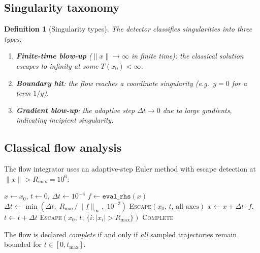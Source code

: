 \documentclass[11pt,a4paper]{article}
\newtheorem{definition}{Definition}
\begin{document}
\subsection{Singularity taxonomy}

\begin{definition}[Singularity types]
The detector classifies singularities into three types:
\begin{enumerate}
  \item \textbf{Finite-time blow-up} ($\lVert x\rVert\to\infty$ in
    finite time): the classical solution escapes to infinity at some
    $T(x_{0})<\infty$.
  \item \textbf{Boundary hit}: the flow reaches a coordinate singularity
    (e.g.\ $y=0$ for a term $1/y$).
  \item \textbf{Gradient blow-up}: the adaptive step $\Delta t\to 0$
    due to large gradients, indicating incipient singularity.
\end{enumerate}
\end{definition}

\subsection{Classical flow analysis}

The flow integrator uses an adaptive-step Euler method with escape
detection at $\lVert x\rVert>R_{\max}=10^{6}$:

\begin{algorithm}[H]
\caption{Classical flow analysis (\texttt{analyze\_classical\_flow})}
\begin{algorithmic}[1]
  \State $x\gets x_{0}$, $t\gets 0$, $\Delta t\gets 10^{-4}$
    \State $f\gets\texttt{eval\_rhs}(x)$
    \State $\Delta t\gets\min(\Delta t,\;R_{\max}/\lVert f\rVert_{\infty},\;10^{-2})$
      \State \Return \textsc{Escape}$(x_{0},\,t,\,\text{all axes})$
    \EndIf
    \State $x\gets x+\Delta t\cdot f$, \quad $t\gets t+\Delta t$
      \State \Return \textsc{Escape}$(x_{0},\,t,\,\{i:\lvert x_{i}\rvert>R_{\max}\})$
    \EndIf
  \EndWhile
\EndFor
\State \Return \textsc{Complete}
\end{algorithmic}
\end{algorithm}

The flow is declared \emph{complete} if and only if \emph{all} sampled
trajectories remain bounded for $t\in[0,t_{\max}]$.
\end{document}
